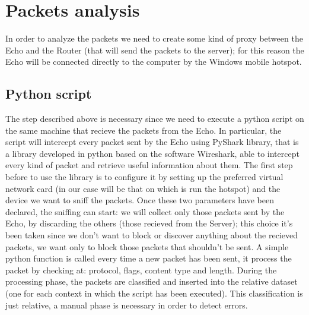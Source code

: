 \documentclass[sigconf]{acmart}
\begin{document}
    \section{Packets analysis}
    In order to analyze the packets we need to create some kind of proxy between the Echo and the Router (that will send the packets to the server); for this reason the Echo will be connected directly to the computer by the Windows mobile hotspot.

    \subsection{Python script}
    The step described above is necessary since we need to execute a python script on the same machine that recieve the packets from the Echo. In particular, the script will intercept every packet sent by the Echo using PyShark library, that is a library developed in python based on the software Wireshark, able to intercept every kind of packet and retrieve useful information about them. The first step before to use the library is to configure it by setting up the preferred virtual network card (in our case will be that on which is run the hotspot) and the device we want to sniff the packets. Once these two parameters have been declared, the sniffing can start: we will collect only those packets sent by the Echo, by discarding the others (those recieved from the Server); this choice it's been taken since we don't want to block or discover anything about the recieved packets, we want only to block those packets that shouldn't be sent. A simple python function is called every time a new packet has been sent, it process the packet by checking at: protocol, flags, content type and length. During the processing phase, the packets are classified and inserted into the relative dataset (one for each context in which the script has been executed). This classification is just relative, a manual phase is necessary in order to detect errors.
\end{document}
